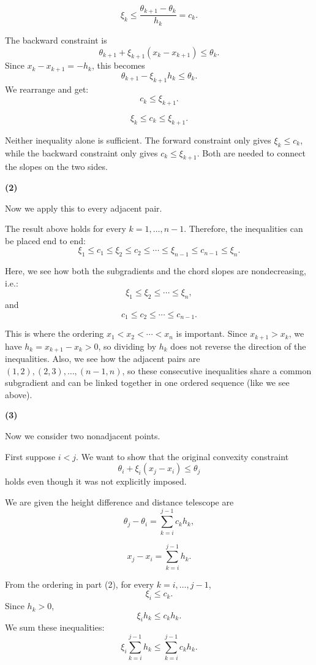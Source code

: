 \documentclass{article}
\begin{document}
\[
\xi_k
\leq
\frac{\theta_{k+1}-\theta_k}{h_k}
=
c_k.
\]

The backward constraint is
\[
\theta_{k+1}+\xi_{k+1}(x_k-x_{k+1})\leq\theta_k.
\]
Since $x_k-x_{k+1}=-h_k$, this becomes
\[
\theta_{k+1}-\xi_{k+1}h_k\leq\theta_k.
\]
We rearrange and get: 
\[
c_k\leq\xi_{k+1}.
\]

\[
\xi_k\leq c_k\leq\xi_{k+1}.
\]

Neither inequality alone is sufficient. The forward constraint only gives
$\boxed{\xi_k\leq c_k}$, while the backward constraint only gives
$\boxed{c_k\leq\xi_{k+1}}$. Both are needed to connect the slopes on the two
sides.


\vspace{5mm}
\textbf{(2)}

Now we apply this to every adjacent pair.

The result above holds for every $k=1,\ldots,n-1$. Therefore, the
inequalities can be placed end to end:
\[
\xi_1
\leq c_1
\leq \xi_2
\leq c_2
\leq \cdots
\leq \xi_{n-1}
\leq c_{n-1}
\leq \xi_n.
\]

Here, we see how both the subgradients and the chord slopes are nondecreasing, i.e.:
\[
\boxed{\xi_1\leq\xi_2\leq\cdots\leq\xi_n,}
\]
and
\[
\boxed{c_1\leq c_2\leq\cdots\leq c_{n-1}.}
\]

This is where the ordering $x_1<x_2<\cdots<x_n$ is important. Since
$x_{k+1}>x_k$, we have $h_k=x_{k+1}-x_k>0$, so dividing by $h_k$
does not reverse the direction of the inequalities. Also,  we see how the
adjacent pairs are $(1,2),(2,3),\ldots,(n-1,n)$, so these consecutive
inequalities share a common subgradient and can be linked together in one ordered sequence (like we see above). 


\vspace{5mm}
\textbf{(3)}

Now we consider two nonadjacent points.

First suppose $i<j$. We want to show that the original convexity
constraint
\[
\theta_i+\xi_i(x_j-x_i)\leq\theta_j
\]
holds even though it was not explicitly imposed.

We are given the height difference and distance telescope are
\[
\theta_j-\theta_i
=
\sum_{k=i}^{j-1}c_kh_k,
\]

\[
x_j-x_i
=
\sum_{k=i}^{j-1}h_k.
\]

From the ordering in part (2), for every $k=i,\ldots,j-1$,
\[
\xi_i\leq c_k.
\]
Since $h_k>0$,
\[
\xi_i h_k\leq c_kh_k.
\]
We sum these inequalities: 
\[
\xi_i\sum_{k=i}^{j-1}h_k
\leq
\sum_{k=i}^{j-1}c_kh_k.
\]
\end{document}

